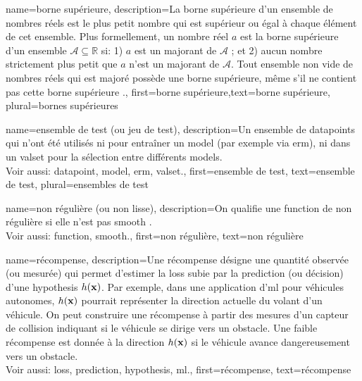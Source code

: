 {name={borne supérieure},
	description={La  borne supérieure d'un ensemble de nombres réels est 
		le plus petit nombre qui est supérieur ou égal à chaque élément de cet ensemble. 
		Plus formellement, un nombre réel $a$ est la borne supérieure d'un ensemble 
		$\mathcal{A} \subseteq \mathbb{R}$ si: 1) $a$ est un majorant de $\mathcal{A}$ ; 
		et 2) aucun nombre strictement plus petit que $a$ n'est un majorant de $\mathcal{A}$. 
		Tout ensemble non vide de nombres réels qui est majoré possède une borne supérieure, même s'il ne 
		contient pas cette borne supérieure \cite[Sec.~1.4]{RudinBookPrinciplesMatheAnalysis}.},
	first={borne supérieure},text={borne supérieure}, plural={bornes supérieures}
}

{name={ensemble de test (ou jeu de test)},
	description={Un ensemble de \glspl{datapoint} qui n'ont été utilisés ni pour entraîner un \gls{model} (par exemple via \gls{erm}), ni dans un \gls{valset} pour la sélection entre différents \glspl{model}.
		\\
		Voir aussi: \gls{datapoint}, \gls{model}, \gls{erm}, \gls{valset}.},
	first={ensemble de test},
	text={ensemble de test}, plural={ensembles de test}
}

{name={non régulière (ou non lisse)},
	description={On qualifie une \gls{function} de non régulière si elle n’est pas \gls{smooth} \cite{nesterov04}.
		\\
		Voir aussi: \gls{function}, \gls{smooth}.},
	first={non régulière},
	text={non régulière}
}

{name={récompense},
	description={Une récompense désigne une quantité observée 
		(ou mesurée) qui permet d’estimer la \gls{loss} subie par la \gls{prediction} 
		(ou décision) d’une \gls{hypothesis} $h({\bf x})$. Par exemple, dans une 
		application d'\gls{ml} pour véhicules autonomes, $h({\bf x})$ pourrait représenter 
		la direction actuelle du volant d’un véhicule. On peut construire une récompense à partir 
		des mesures d’un capteur de collision indiquant si le véhicule se dirige vers un obstacle. 
		Une faible récompense est donnée à la direction $h({\bf x})$ si le véhicule 
		avance dangereusement vers un obstacle.
		\\
		Voir aussi: \gls{loss}, \gls{prediction}, \gls{hypothesis}, \gls{ml}.},
	first={récompense}, text={récompense}}

